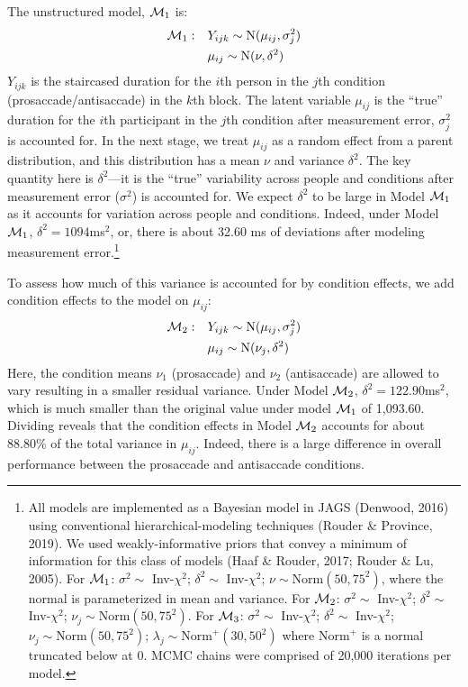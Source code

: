 \documentclass[
  ,man,floatsintext]{apa6}
\begin{document}
The unstructured model, \({\cal M}_1\) is:
\[ \begin{aligned}
{\cal M}_1:\quad & Y_{ijk} \sim \mbox{N}(\mu_{ij},\sigma_j^2)\\
&\mu_{ij} \sim \mbox{N}(\nu,\delta^2)
\end{aligned}
\]
\(Y_{ijk}\) is the staircased duration for the \(i\)th person in the \(j\)th condition (prosaccade/antisaccade) in the \(k\)th block. The latent variable \(\mu_{ij}\) is the ``true'' duration for the \(i\)th participant in the \(j\)th condition after measurement error, \(\sigma^2_j\) is accounted for. In the next stage, we treat \(\mu_{ij}\) as a random effect from a parent distribution, and this distribution has a mean \(\nu\) and variance \(\delta^2\). The key quantity here is \(\delta^2\)---it is the ``true'' variability across people and conditions after measurement error (\(\sigma^2\)) is accounted for. We expect \(\delta^2\) to be large in Model \({\cal M}_1\) as it accounts for variation across people and conditions. Indeed, under Model \({\cal M}_1\), \(\delta^2= 1094\)ms\(^2\), or, there is about 32.60 ms of deviations after modeling measurement error.\footnote{All models are implemented as a Bayesian model in JAGS (Denwood, 2016) using conventional hierarchical-modeling techniques (Rouder \& Province, 2019). We used weakly-informative priors that convey a minimum of information for this class of models (Haaf \& Rouder, 2017; Rouder \& Lu, 2005). For \({\cal M}_1\): \(\sigma^2\sim\) Inv-\(\chi^2\); \(\delta^2\sim\) Inv-\(\chi^2\); \(\nu\sim\mbox{Norm}(50,75^2)\), where the normal is parameterized in mean and variance. For \({\cal M}_2\): \(\sigma^2\sim\) Inv-\(\chi^2\); \(\delta^2\sim\) Inv-\(\chi^2\); \(\nu_j\sim\mbox{Norm}(50,75^2)\). For \({\cal M}_3\): \(\sigma^2\sim\) Inv-\(\chi^2\); \(\delta^2\sim\) Inv-\(\chi^2\); \(\nu_j\sim\mbox{Norm}(50,75^2)\); \(\lambda_j\sim\mbox{Norm}^+(30,50^2)\) where \(\mbox{Norm}^+\) is a normal truncated below at 0. MCMC chains were comprised of 20,000 iterations per model.}

To assess how much of this variance is accounted for by condition effects, we add condition effects to the model on \(\mu_{ij}\):
\[ \begin{aligned}
{\cal M}_2:\quad & Y_{ijk} \sim \mbox{N}(\mu_{ij},\sigma_j^2)\\
&\mu_{ij} \sim \mbox{N}(\nu_j,\delta^2)
\end{aligned}
\]
Here, the condition means \(\nu_1\) (prosaccade) and \(\nu_2\) (antisaccade) are allowed to vary resulting in a smaller residual variance. Under Model \({\cal M}_2\), \(\delta^2= 122.90\)ms\(^2\), which is much smaller than the original value under model \({\cal M}_1\) of 1,093.60. Dividing reveals that the condition effects in Model \({\cal M}_2\) accounts for about 88.80\% of the total variance in \(\mu_{ij}\). Indeed, there is a large difference in overall performance between the prosaccade and antisaccade conditions.
\end{document}
